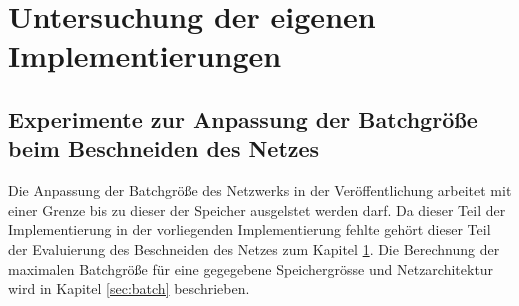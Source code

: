 \chapter{Untersuchung der eigenen Implementierungen}\label{sec:me}
\section{Experimente zur Anpassung der Batchgröße beim Beschneiden des Netzes}\label{sec:ptnew}
Die Anpassung der Batchgröße des Netzwerks in der Veröffentlichung arbeitet mit einer Grenze bis zu dieser der Speicher ausgelstet werden darf. Da dieser Teil der Implementierung in der vorliegenden Implementierung fehlte gehört dieser Teil der Evaluierung des Beschneiden des Netzes zum Kapitel \ref{sec:me}.
Die Berechnung der maximalen Batchgröße für eine gegegebene Speichergrösse und Netzarchitektur wird in Kapitel \ref{sec:batch} beschrieben.


